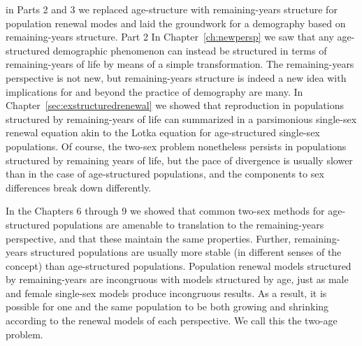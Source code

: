 in Parts 2 and 3 we replaced age-structure with remaining-years structure
for population renewal modes and laid the groundwork for a demography
based on remaining-years structure. Part 2  In Chapter~\ref{ch:newpersp} we saw that any
age-structured demographic phenomenon can instead be structured in terms of
remaining-years of life by means of a simple transformation. The
remaining-years perspective is not new, but remaining-years structure is indeed
a new idea with implications for and beyond the practice of demography are many.
In Chapter~\ref{sec:exstructuredrenewal} we showed that reproduction in
populations structured by remaining-years of life can
summarized in a parsimonious single-sex renewal equation akin to the Lotka
equation for age-structured single-sex populations. Of course, the two-sex
problem nonetheless persists in populations structured by remaining years of
life, but the pace of divergence is usually slower than in the case of
age-structured populations, and the components to sex differences break down
differently.

In the Chapters 6 through 9 we showed that common two-sex
methods for age-structured populations are amenable to translation
to the remaining-years perspective, and that these maintain the same properties.
Further, remaining-years structured populations are usually more stable (in
different senses of the concept) than age-structured populations. Population renewal models structured
by remaining-years are incongruous with models structured by age, just as male and 
female single-sex models produce incongruous results. As a result, it is
possible for one and the same population to be both growing and shrinking
according to the renewal models of each perspective. We call this the two-age problem.



